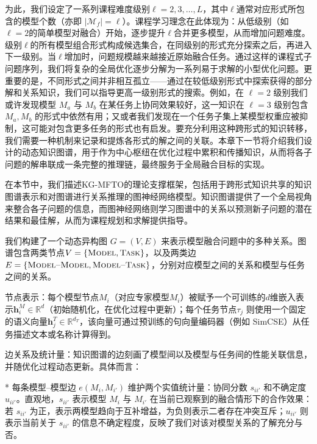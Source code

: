 \documentclass[../main.tex]{subfiles}
\begin{document}
为此，我们设定了一系列课程难度级别$\ell=2,3,\ldots,L$，其中$\ell$通常对应形式所包含的模型个数（亦即 $|\mathcal{M}_f|=\ell$）。课程学习理念在此体现为：从低级别（如$\ell=2$的简单模型对融合）开始，逐步提升$\ell$合并更多模型，从而增加问题难度。级别$\ell$的所有模型组合形式构成候选集合，在同级别的形式充分探索之后，再进入下一级别。当$\ell$增加时，问题规模越来越接近原始融合任务。通过这样的课程式子问题序列，我们将复杂的全局优化逐步分解为一系列易于求解的小型优化问题。更重要的是，不同形式之间并非相互孤立——通过在较低级别形式中探索获得的部分解和关系知识，我们可以指导更高一级别形式的搜索。例如，在 $\ell=2$ 级别我们或许发现模型 $M_a$ 与 $M_b$ 在某任务上协同效果较好，这一知识在 $\ell=3$ 级别包含 $M_a, M_b$ 的形式中依然有用；又或者我们发现在一个任务子集上某模型权重应被抑制，这可能对包含更多任务的形式也有启发。要充分利用这种跨形式的知识转移，我们需要一种机制来记录和提炼各形式的解之间的关联。本章下一节将介绍我们设计的动态知识图谱，用于作为中心枢纽在优化过程中累积和传播知识，从而将各子问题的解串联成一条完整的推理链，最终服务于全局融合目标的实现。


在本节中，我们描述KG-MFTO的理论支撑框架，包括用于跨形式知识共享的知识图谱表示和对图谱进行关系推理的图神经网络模型。知识图谱提供了一个全局视角来整合各子问题的信息，而图神经网络则学习图谱中的关系以预测新子问题的潜在结果和最佳解，从而为课程规划和求解提供指导。


我们构建了一个动态异构图 $G=(V,E)$ 来表示模型融合问题中的多种关系。图谱包含两类节点$V=\{\textsc{Model}, \textsc{Task}\}$，以及两类边$E=\{\textsc{Model--Model}, \textsc{Model--Task}\}$，分别对应模型之间的关系和模型与任务之间的关系。

节点表示：每个模型节点$M_i$（对应专家模型$M_i$）被赋予一个可训练的$d$维嵌入表示$\mathbf{h}^M_i \in \mathbb{R}^d$（初始随机化，在优化过程中更新）；每个任务节点$\tau_j$ 则使用一个固定的语义向量$\mathbf{h}^T_j \in \mathbb{R}^{d_T}$，该向量可通过预训练的句向量编码器（例如 SimCSE）从任务描述文本或名称计算得到。

边关系及统计量：知识图谱的边刻画了模型间以及模型与任务间的性能关联信息，并随优化过程动态更新。具体而言：

* 每条模型--模型边 $e(M_i, M_{i'})$ 维护两个实值统计量：协同分数 $s_{ii'}$ 和不确定度 $u_{ii'}$。直观地，$s_{ii'}$ 表示模型 $M_i$ 与 $M_{i'}$ 在当前已观察到的融合情形下的合作效果：若 $s_{ii'}$ 为正，表示两模型趋向于互补增益，为负则表示二者存在冲突互斥；$u_{ii'}$ 则表示当前关于 $s_{ii'}$ 的信息不确定程度，反映了我们对该对模型关系的了解充分与否。
\end{document}
